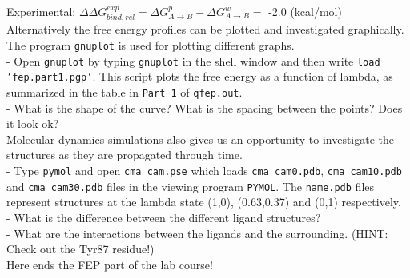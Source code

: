 \documentclass[a4paper,12pt]{article}
\newcommand{\pymol}{\texttt{PYMOL}}
\begin{document}
Experimental: $\Delta \Delta G_{bind,rel}^{exp} = \Delta G_{A \rightarrow B}^p-\Delta G_{A \rightarrow B}^w=$ -2.0 (kcal/mol)\\

Alternatively the free energy profiles can be plotted and investigated
graphically. The program \texttt{gnuplot} is used for plotting different graphs.\\

- Open \texttt{gnuplot} by typing \texttt{gnuplot} in the shell
window and then write \texttt{load 'fep.part1.pgp'}. This script
plots the free energy as a function of lambda, as summarized in
the table in \texttt{Part 1} of \texttt{qfep.out}.\\

- What is the shape of the curve? What is the spacing between the
points? Does it look ok?\\

Molecular dynamics simulations also gives us an opportunity to
investigate the structures as they are propagated through time. \\

- Type \texttt{pymol} and open \texttt{cma\_cam.pse} which loads
\texttt{cma\_cam0.pdb}, \texttt{cma\_cam10.pdb} and
\texttt{cma\_cam30.pdb} files in the viewing program \pymol. The
\texttt{name.pdb} files represent structures at the lambda state
(1,0), (0.63,0.37) and (0,1) respectively. \\

- What is the difference between the different ligand structures?\\

- What are the interactions between the ligands and the
surrounding. (HINT: Check out the Tyr87 residue!)\\

Here ends the FEP part of the lab course!


\newpage
\appendix
\end{document}
